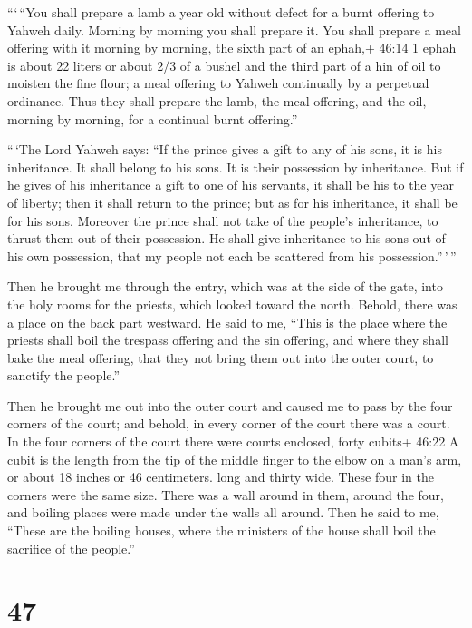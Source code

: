  ```\,``You shall prepare a lamb a year old without defect
for a burnt offering to Yahweh daily. Morning by morning you shall
prepare it.  You shall prepare a meal offering with it
morning by morning, the sixth part of an ephah,+ 46:14 1 ephah is about
22 liters or about 2/3 of a bushel and the third part of a hin of oil to
moisten the fine flour; a meal offering to Yahweh continually by a
perpetual ordinance.  Thus they shall prepare the lamb, the
meal offering, and the oil, morning by morning, for a continual burnt
offering.''

 ``\,`The Lord Yahweh says: ``If the prince gives a gift to
any of his sons, it is his inheritance. It shall belong to his sons. It
is their possession by inheritance.  But if he gives of his
inheritance a gift to one of his servants, it shall be his to the year
of liberty; then it shall return to the prince; but as for his
inheritance, it shall be for his sons.  Moreover the prince
shall not take of the people's inheritance, to thrust them out of their
possession. He shall give inheritance to his sons out of his own
possession, that my people not each be scattered from his
possession.''\,'\,''

 Then he brought me through the entry, which was at the
side of the gate, into the holy rooms for the priests, which looked
toward the north. Behold, there was a place on the back part westward.
 He said to me, ``This is the place where the priests shall
boil the trespass offering and the sin offering, and where they shall
bake the meal offering, that they not bring them out into the outer
court, to sanctify the people.''

 Then he brought me out into the outer court and caused me
to pass by the four corners of the court; and behold, in every corner of
the court there was a court.  In the four corners of the
court there were courts enclosed, forty cubits+ 46:22 A cubit is the
length from the tip of the middle finger to the elbow on a man's arm, or
about 18 inches or 46 centimeters. long and thirty wide. These four in
the corners were the same size.  There was a wall around in
them, around the four, and boiling places were made under the walls all
around.  Then he said to me, ``These are the boiling
houses, where the ministers of the house shall boil the sacrifice of the
people.''

\hypertarget{section-45}{%
\section{47}\label{section-45}}

